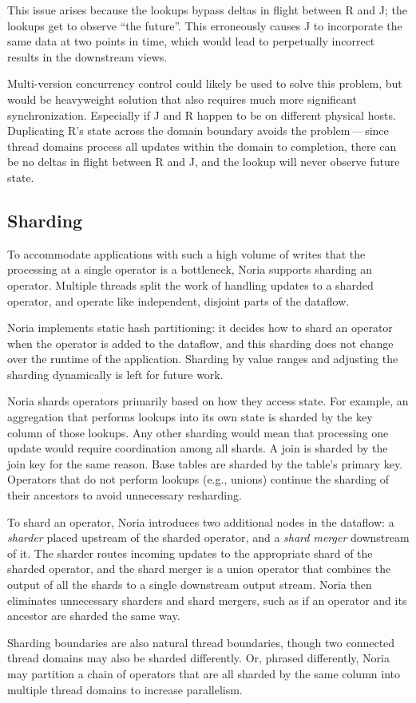 This issue arises because the lookups bypass deltas in flight between R and J;
the lookups get to observe ``the future''. This erroneously causes J to
incorporate the same data at two points in time, which would lead to perpetually
incorrect results in the downstream views.

Multi-version concurrency control could likely be used to solve this problem,
but would be heavyweight solution that also requires much more significant
synchronization. Especially if J and R happen to be on different physical hosts.
Duplicating R's state across the domain boundary avoids the problem\,---\,since
thread domains process all updates within the domain to completion, there can be
no deltas in flight between R and J, and the lookup will never observe future
state.

\subsection{Sharding}
\label{s:noria:sharding}

To accommodate applications with such a high volume of writes that the
processing at a single operator is a bottleneck, Noria supports sharding an
operator. Multiple threads split the work of handling updates to a sharded
operator, and operate like independent, disjoint parts of the dataflow.

Noria implements static hash partitioning: it decides how to shard an operator
when the operator is added to the dataflow, and this sharding does not change
over the runtime of the application. Sharding by value ranges and adjusting the
sharding dynamically is left for future work.

Noria shards operators primarily based on how they access state. For example, an
aggregation that performs lookups into its own state is sharded by the key
column of those lookups. Any other sharding would mean that processing one
update would require coordination among all shards. A join is sharded by the
join key for the same reason. Base tables are sharded by the table's primary
key. Operators that do not perform lookups (e.g., unions) continue the sharding
of their ancestors to avoid unnecessary resharding.

To shard an operator, Noria introduces two additional nodes in the dataflow: a
\emph{sharder} placed upstream of the sharded operator, and a \emph{shard
merger} downstream of it. The sharder routes incoming updates to the appropriate
shard of the sharded operator, and the shard merger is a union operator that
combines the output of all the shards to a single downstream output stream.
Noria then eliminates unnecessary sharders and shard mergers, such as if an
operator and its ancestor are sharded the same way.

Sharding boundaries are also natural thread boundaries, though two connected
thread domains may also be sharded differently. Or, phrased differently, Noria
may partition a chain of operators that are all sharded by the same column into
multiple thread domains to increase parallelism.

